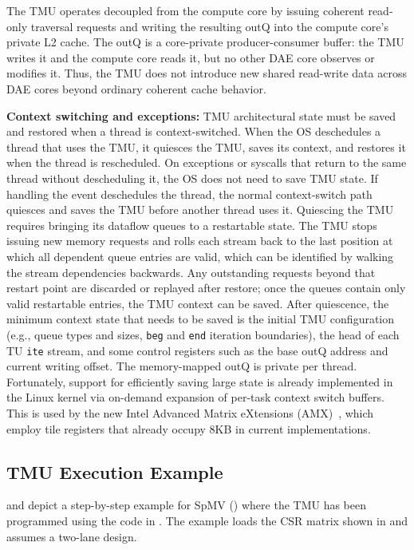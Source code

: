 The TMU operates decoupled from the compute core by issuing coherent read-only traversal requests and writing the resulting outQ into the compute core's private L2 cache. The outQ is a core-private producer-consumer buffer: the TMU writes it and the compute core reads it, but no other DAE core observes or modifies it. Thus, the TMU does not introduce new shared read-write data across DAE cores beyond ordinary coherent cache behavior.

\noindent\textbf{Context switching and exceptions:}
TMU architectural state must be saved and restored when a thread is context-switched. When the OS deschedules a thread that uses the TMU, it quiesces the TMU, saves its context, and restores it when the thread is rescheduled. 
On exceptions or syscalls that return to the same thread without descheduling it, the OS does not need to save TMU state. If handling the event deschedules the thread, the normal context-switch path quiesces and saves the TMU before another thread uses it.
Quiescing the TMU requires bringing its dataflow queues to a restartable state. The TMU stops issuing new memory requests and rolls each stream back to the last position at which all dependent queue entries are valid, which can be identified by walking the stream dependencies backwards. Any outstanding requests beyond that restart point are discarded or replayed after restore; once the queues contain only valid restartable entries, the TMU context can be saved.
After quiescence, the minimum context state that needs to be saved is the initial TMU configuration (e.g., queue types and sizes, \texttt{beg} and \texttt{end} iteration boundaries), the head of each TU \texttt{ite} stream, and some control registers such as the base outQ address and current writing offset. The memory-mapped outQ is private per thread.
Fortunately, support for efficiently saving large state is already implemented in the Linux kernel via on-demand expansion of per-task context switch buffers. This is used by the new Intel Advanced Matrix eXtensions (AMX)~\cite{intel2023amx,nassif2022isscc}, which employ tile registers that already occupy 8KB in current implementations.

\subsection{TMU Execution Example} \label{sec:tmu-execution-example} %

 and  depict a step-by-step example for SpMV () where the TMU has been programmed using the code in . The example loads the CSR matrix shown in  and assumes a two-lane design.

